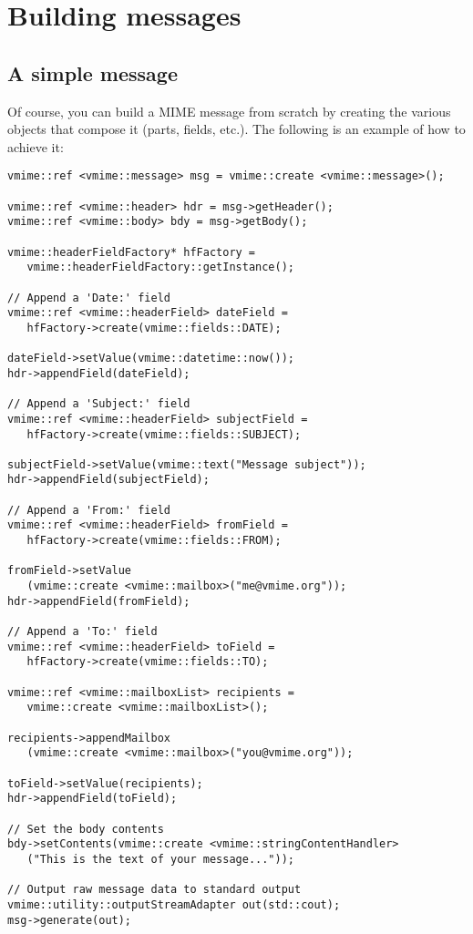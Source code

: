 \section{Building messages}

\subsection{A simple message\label{msg-building-simple-message}} %

Of course, you can build a MIME message from scratch by creating the various
objects that compose it (parts, fields, etc.). The following is an example of
how to achieve it:

\begin{lstlisting}[caption={Building a simple message from scratch}]
vmime::ref <vmime::message> msg = vmime::create <vmime::message>();

vmime::ref <vmime::header> hdr = msg->getHeader();
vmime::ref <vmime::body> bdy = msg->getBody();

vmime::headerFieldFactory* hfFactory =
   vmime::headerFieldFactory::getInstance();

// Append a 'Date:' field
vmime::ref <vmime::headerField> dateField =
   hfFactory->create(vmime::fields::DATE);

dateField->setValue(vmime::datetime::now());
hdr->appendField(dateField);

// Append a 'Subject:' field
vmime::ref <vmime::headerField> subjectField =
   hfFactory->create(vmime::fields::SUBJECT);

subjectField->setValue(vmime::text("Message subject"));
hdr->appendField(subjectField);

// Append a 'From:' field
vmime::ref <vmime::headerField> fromField =
   hfFactory->create(vmime::fields::FROM);

fromField->setValue
   (vmime::create <vmime::mailbox>("me@vmime.org"));
hdr->appendField(fromField);

// Append a 'To:' field
vmime::ref <vmime::headerField> toField =
   hfFactory->create(vmime::fields::TO);

vmime::ref <vmime::mailboxList> recipients =
   vmime::create <vmime::mailboxList>();

recipients->appendMailbox
   (vmime::create <vmime::mailbox>("you@vmime.org"));

toField->setValue(recipients);
hdr->appendField(toField);

// Set the body contents
bdy->setContents(vmime::create <vmime::stringContentHandler>
   ("This is the text of your message..."));

// Output raw message data to standard output
vmime::utility::outputStreamAdapter out(std::cout);
msg->generate(out);
\end{lstlisting}

